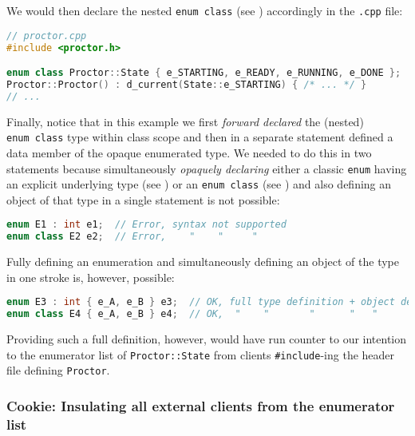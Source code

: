 \noindent We would then declare the nested
\lstinline!enum!~\lstinline!class! (see ) accordingly in the
\lstinline!.cpp! file:

\begin{lstlisting}[language=C++]
// proctor.cpp
#include <proctor.h>

enum class Proctor::State { e_STARTING, e_READY, e_RUNNING, e_DONE };
Proctor::Proctor() : d_current(State::e_STARTING) { /* ... */ }
// ...
\end{lstlisting}

\noindent Finally, notice that in this example we first \emph{forward declared}
the (nested) \lstinline!enum!~\lstinline!class! type within class scope and
then in a separate statement defined a data member of the opaque
enumerated type. We needed to do this in two statements because
simultaneously \emph{opaquely declaring} either a classic \lstinline!enum!
having an explicit underlying type (see ) or an
\lstinline!enum!~\lstinline!class! (see ) and also defining an object
of that type in a single statement is not possible:

\begin{lstlisting}[language=C++]
enum E1 : int e1;  // Error, syntax not supported
enum class E2 e2;  // Error,    "    "     "
\end{lstlisting}

\noindent Fully defining an enumeration and simultaneously defining an object of
the type in one stroke is, however, possible:

\begin{lstlisting}[language=C++]
enum E3 : int { e_A, e_B } e3;  // OK, full type definition + object definition
enum class E4 { e_A, e_B } e4;  // OK,  "    "       "      "   "        "
\end{lstlisting}

\noindent Providing such a full definition, however, would have run counter to our
intention to  the enumerator list of
\lstinline!Proctor::State! from clients \lstinline!#include!-ing the header
file defining \lstinline!Proctor!.

\subsubsection[Cookie: Insulating all external clients from the enumerator list]{Cookie: Insulating all external clients from the enumerator list}\label{cookie:-insulating-all-external-clients-from-the-enumerator-list}

